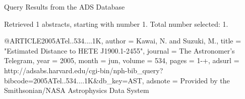 Query Results from the ADS Database


Retrieved 1 abstracts, starting with number 1.  Total number selected: 1.

@ARTICLE{2005ATel..534....1K,
   author = {{Kawai}, N. and {Suzuki}, M.},
    title = "{Estimated Distance to HETE J1900.1-2455}",
  journal = {The Astronomer's Telegram},
     year = 2005,
    month = jun,
   volume = 534,
    pages = {1-+},
   adsurl = {http://adsabs.harvard.edu/cgi-bin/nph-bib_query?bibcode=2005ATel..534....1K&db_key=AST},
  adsnote = {Provided by the Smithsonian/NASA Astrophysics Data System}
}


